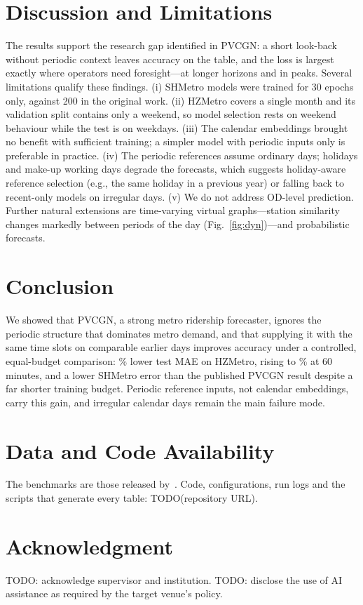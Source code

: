 \documentclass[journal]{IEEEtran}
\begin{document}
\section{Discussion and Limitations}
The results support the research gap identified in PVCGN: a short look-back without periodic context leaves accuracy on the table, and the loss is largest exactly where operators need foresight---at longer horizons and in peaks. Several limitations qualify these findings. (i) SHMetro models were trained for 30 epochs only, against 200 in the original work. (ii) HZMetro covers a single month and its validation split contains only a weekend, so model selection rests on weekend behaviour while the test is on weekdays. (iii) The calendar embeddings brought no benefit with sufficient training; a simpler model with periodic inputs only is preferable in practice. (iv) The periodic references assume ordinary days; holidays and make-up working days degrade the forecasts, which suggests holiday-aware reference selection (e.g., the same holiday in a previous year) or falling back to recent-only models on irregular days. (v) We do not address OD-level prediction. Further natural extensions are time-varying virtual graphs---station similarity changes markedly between periods of the day (Fig.~\ref{fig:dyn})---and probabilistic forecasts.

\section{Conclusion}
We showed that PVCGN, a strong metro ridership forecaster, ignores the periodic structure that dominates metro demand, and that supplying it with the same time slots on comparable earlier days improves accuracy under a controlled, equal-budget comparison: \hzGain\% lower test MAE on HZMetro, rising to \hzGainSixty\% at 60 minutes, and a lower SHMetro error than the published PVCGN result despite a far shorter training budget. Periodic reference inputs, not calendar embeddings, carry this gain, and irregular calendar days remain the main failure mode.

\section*{Data and Code Availability}
The benchmarks are those released by~\cite{liu2022pvcgn}. Code, configurations, run logs and the scripts that generate every table: TODO(repository URL).

\section*{Acknowledgment}
TODO: acknowledge supervisor and institution. TODO: disclose the use of AI assistance as required by the target venue's policy.
\end{document}
